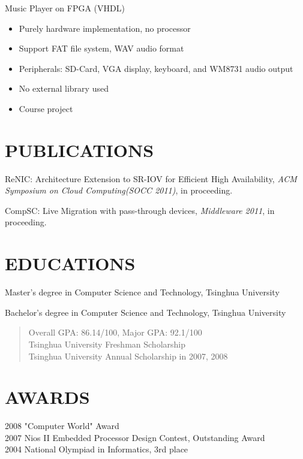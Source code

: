 \documentclass[11pt]{res} %
\begin{document}
\begin{resume}
Music Player on FPGA (VHDL)

\begin{itemize} \itemsep -2pt
\item Purely hardware implementation, no processor
\item Support FAT file system, WAV audio format
\item Peripherals: SD-Card, VGA display, keyboard, and WM8731 audio output
\item No external library used
\item Course project
\end{itemize}

\section{PUBLICATIONS}
ReNIC: Architecture Extension to SR-IOV for Efficient High Availability, {\itshape ACM Symposium on Cloud Computing(SOCC 2011)}, in proceeding.

CompSC: Live Migration with pass-through devices, {\itshape Middleware 2011}, in proceeding.

\section{EDUCATIONS}
Master's degree in Computer Science and Technology, Tsinghua University

Bachelor's degree in Computer Science and Technology, Tsinghua University
\begin{quote}
Overall GPA: 86.14/100, Major GPA: 92.1/100 \\
Tsinghua University Freshman Scholarship \\
Tsinghua University Annual Scholarship in 2007, 2008 \\
\end{quote}

\section{AWARDS}
2008 "Computer World" Award \\
2007 Nios II Embedded Processor Design Contest, Outstanding Award \\
2004 National Olympiad in Informatics, 3rd place

\end{resume}
\end{document}
